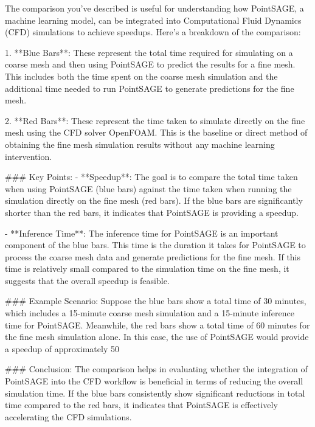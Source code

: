 The comparison you've described is useful for understanding how PointSAGE, a machine learning model, can be integrated into Computational Fluid Dynamics (CFD) simulations to achieve speedups. Here's a breakdown of the comparison:

1. **Blue Bars**: These represent the total time required for simulating on a coarse mesh and then using PointSAGE to predict the results for a fine mesh. This includes both the time spent on the coarse mesh simulation and the additional time needed to run PointSAGE to generate predictions for the fine mesh.

2. **Red Bars**: These represent the time taken to simulate directly on the fine mesh using the CFD solver OpenFOAM. This is the baseline or direct method of obtaining the fine mesh simulation results without any machine learning intervention.

### Key Points:
- **Speedup**: The goal is to compare the total time taken when using PointSAGE (blue bars) against the time taken when running the simulation directly on the fine mesh (red bars). If the blue bars are significantly shorter than the red bars, it indicates that PointSAGE is providing a speedup.
  
- **Inference Time**: The inference time for PointSAGE is an important component of the blue bars. This time is the duration it takes for PointSAGE to process the coarse mesh data and generate predictions for the fine mesh. If this time is relatively small compared to the simulation time on the fine mesh, it suggests that the overall speedup is feasible.

### Example Scenario:
Suppose the blue bars show a total time of 30 minutes, which includes a 15-minute coarse mesh simulation and a 15-minute inference time for PointSAGE. Meanwhile, the red bars show a total time of 60 minutes for the fine mesh simulation alone. In this case, the use of PointSAGE would provide a speedup of approximately 50%

### Conclusion:
The comparison helps in evaluating whether the integration of PointSAGE into the CFD workflow is beneficial in terms of reducing the overall simulation time. If the blue bars consistently show significant reductions in total time compared to the red bars, it indicates that PointSAGE is effectively accelerating the CFD simulations.